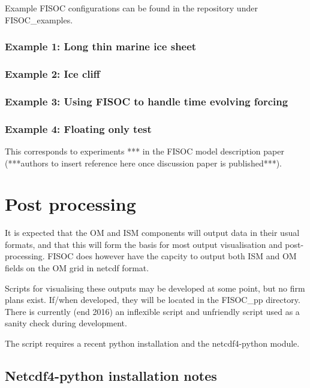 \documentclass[12pt]{article}
\begin{document}
Example FISOC configurations can be found in the repository under FISOC\_examples. 

\subsubsection{Example 1: Long thin marine ice sheet}
\subsubsection{Example 2: Ice cliff}
\subsubsection{Example 3: Using FISOC to handle time evolving forcing}
\subsubsection{Example 4: Floating only test}

This corresponds to experiments *** in the FISOC model description paper 
(***authors to insert reference here once discussion paper is published***).




\section{Post processing}

It is expected that the OM and ISM components will output data in their usual formats, 
and that this will form the basis for most output visualisation and post-processing.
FISOC does however have the capcity to output both ISM and OM fields on the OM grid 
in netcdf format.

Scripts for visualising these outputs may be developed at some point, but no firm 
plans exist.  If/when developed, they will be located in the FISOC\_pp directory.
There is currently (end 2016) an inflexible script and unfriendly script used as a sanity 
check during development.

The script requires a recent python installation and the netcdf4-python module.




\subsection{Netcdf4-python installation notes}
\end{document}
